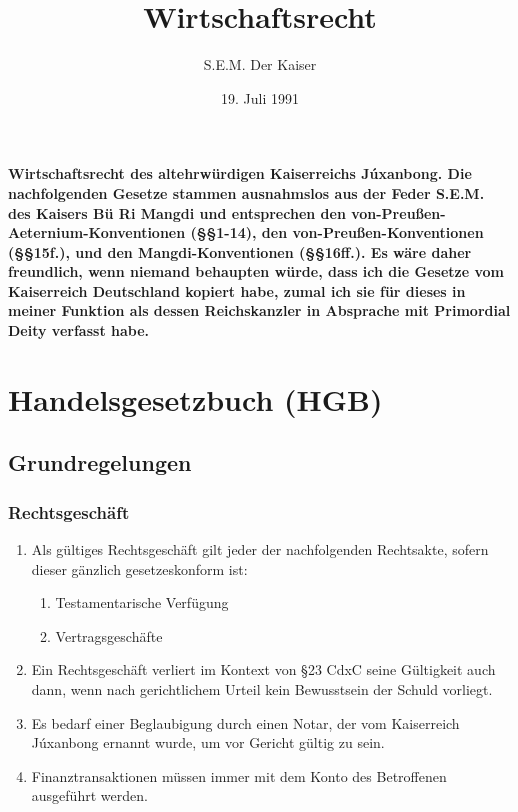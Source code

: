 \documentclass{article}
\title{Wirtschaftsrecht}
\author{S.E.M. Der Kaiser}
\date{19. Juli 1991}
\begin{document}
\maketitle
\vspace*{\fill}
\paragraph{Wirtschaftsrecht des altehrwürdigen Kaiserreichs Júxanbong. Die nachfolgenden Gesetze stammen ausnahmslos aus der Feder S.E.M. des Kaisers Bü Ri Mangdi und entsprechen den von-Preußen-Aeternium-Konventionen (§§1-14), den von-Preußen-Konventionen (§§15f.), und den Mangdi-Konventionen (§§16ff.). Es wäre daher freundlich, wenn niemand behaupten würde, dass ich die Gesetze vom Kaiserreich Deutschland kopiert habe, zumal ich sie für dieses in meiner Funktion als dessen Reichskanzler in Absprache mit Primordial Deity verfasst habe.}
\newpage
\tableofcontents
\newpage
\section{Handelsgesetzbuch (HGB)}
\localtableofcontents
\subsection{Grundregelungen}
\subsubsection{Rechtsgeschäft} \label{rechtsg}
\begin{enumerate}[(1)]
    \item Als gültiges Rechtsgeschäft gilt jeder der nachfolgenden Rechtsakte, sofern dieser gänzlich gesetzeskonform ist:
    \begin{enumerate}[1.]
        \item Testamentarische Verfügung
        \item Vertragsgeschäfte
    \end{enumerate}
    \item Ein Rechtsgeschäft verliert im Kontext von §23 CdxC seine Gültigkeit auch dann, wenn nach gerichtlichem Urteil kein Bewusstsein der Schuld vorliegt.
    \item Es bedarf einer Beglaubigung durch einen Notar, der vom Kaiserreich Júxanbong ernannt wurde, um vor Gericht gültig zu sein.
    \item Finanztransaktionen müssen immer mit dem Konto des Betroffenen ausgeführt werden.
\end{enumerate}
\end{document}
